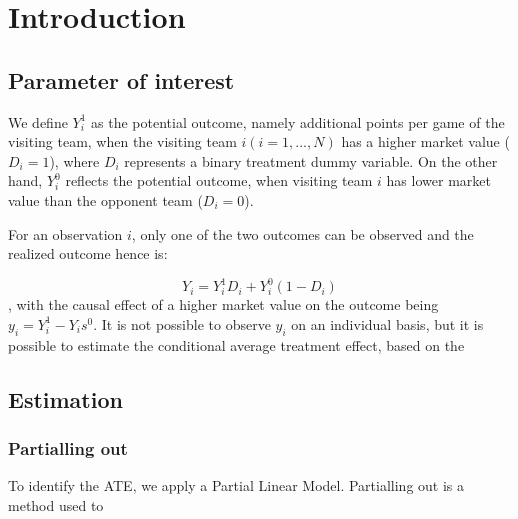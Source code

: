 \section{Introduction}

\subsection{Parameter of interest}
We define $Y^1_i$ as the potential outcome, namely additional points per game of the visiting team, when the visiting
team $i(i = 1, ..., N)$ has a higher market value ($D_i = 1$), where $D_i$ represents a binary treatment dummy variable.
On the other hand, $Y_i^0$ reflects the potential outcome, when visiting team $i$ has lower market value than the opponent team ($D_i = 0$).

For an observation $i$, only one of the two outcomes can be observed and the realized outcome hence is:

\[ Y_i = Y_i^1D_i + Y_i^0(1-D_i)\], with the causal effect of a higher market value on the outcome being $y_i = Y_i^1 - Y_is^0$.
It is not possible to observe $y_i$ on an individual basis, but it is possible to estimate the conditional
average treatment effect, based on the

\subsection{Estimation}

\subsubsection{Partialling out}
To identify the ATE, we apply a Partial Linear Model. Partialling out is a method used to
